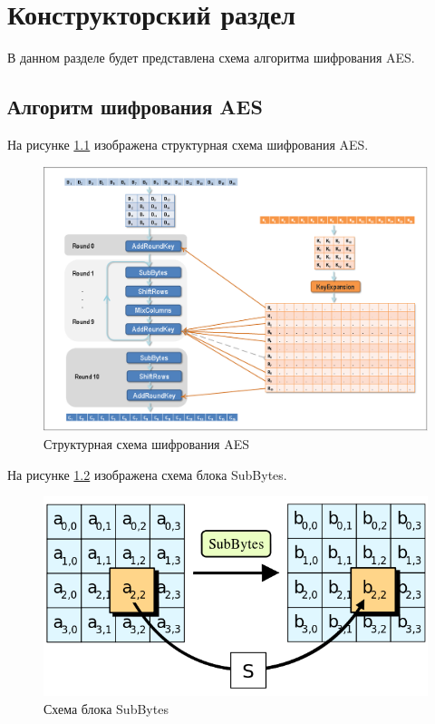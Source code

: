 \chapter{Конструкторский раздел}
\label{cha:design}

В данном разделе будет представлена схема алгоритма шифрования AES.

\section{Алгоритм шифрования AES}

На рисунке \ref{fig:des01} изображена структурная схема шифрования AES.


\begin{figure}[H]
	\centering
	\includegraphics[width=1\linewidth]{img/aes_gen}
	\caption{Структурная схема шифрования AES}
	\label{fig:des01}
\end{figure}

На рисунке \ref{fig:des3} изображена схема блока SubBytes.

\begin{figure}[H]
	\centering
	\includegraphics[width=0.7\linewidth]{img/aes_subb}
	\caption{Схема блока SubBytes}
	\label{fig:des3}
\end{figure}

